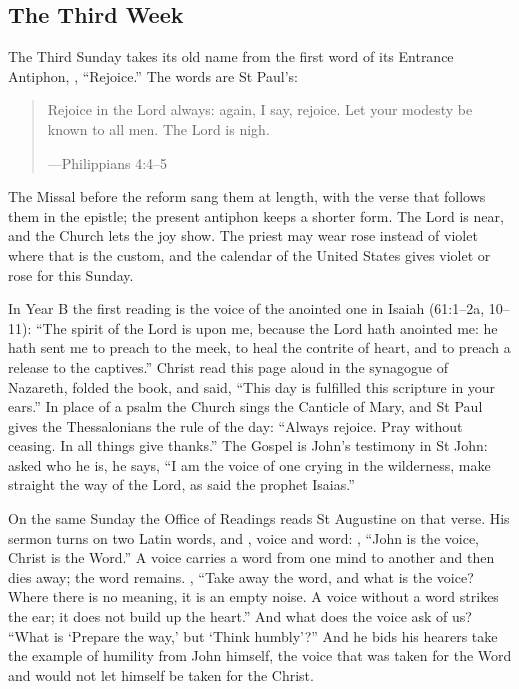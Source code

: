 \subsection{The Third Week}\label{sec:week3}

The Third Sunday takes its old name from the first word of its Entrance
Antiphon, , ``Rejoice.'' The words are St Paul's:

\begin{quote}
Rejoice in the Lord always: again, I say, rejoice. Let your modesty be known to
all men. The Lord is nigh.\par
{\smallskip\noindent\small ---Philippians 4:4--5\par}
\end{quote}

\noindent The Missal before the reform sang them at length, with the verse that
follows them in the epistle; the present antiphon keeps a shorter form. The
Lord is near, and the Church lets the joy show. The priest may wear rose
instead of violet where that is the custom, and the calendar of the United
States gives violet or rose for this Sunday.

In Year B the first reading is the voice of the anointed one in Isaiah
(61:1--2a, 10--11): ``The spirit of the Lord is upon me, because the Lord hath
anointed me: he hath sent me to preach to the meek, to heal the contrite of
heart, and to preach a release to the captives.'' Christ read this page aloud in
the synagogue of Nazareth, folded the book, and said, ``This day is fulfilled
this scripture in your ears.'' In place of a psalm the Church sings the
Canticle of Mary, and St Paul gives the Thessalonians the rule of the day:
``Always rejoice. Pray without ceasing. In all things give thanks.'' The Gospel
is John's testimony in St John: asked who he is, he says, ``I am the voice of
one crying in the wilderness, make straight the way of the Lord, as said the
prophet Isaias.''

On the same Sunday the Office of Readings reads St Augustine on that verse. His
sermon turns on two Latin words,  and , voice and word:
, ``John is the voice, Christ is the Word.''
A voice carries a word from one mind to another and then dies away; the word
remains. , ``Take away the
word, and what is the voice? Where there is no meaning, it is an empty noise. A
voice without a word strikes the ear; it does not build up the heart.'' And what
does the voice ask of us?  ``What is `Prepare the way,' but `Think humbly'?'' And he bids his
hearers take the example of humility from John himself, the voice that was
taken for the Word and would not let himself be taken for the Christ.

